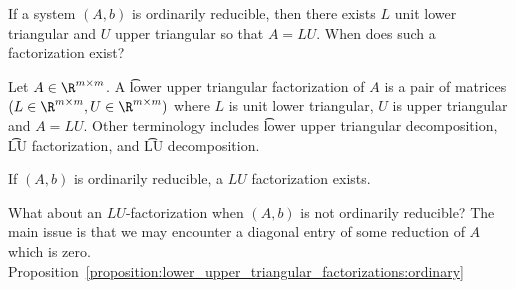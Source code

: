 

If a system $(A, b)$ is ordinarily reducible, then there exists $L$ unit lower triangular and $U$ upper triangular so that $A = LU$.
When does such a factorization exist?


Let $A \in \R^{m \times m}$.
A \t{lower upper triangular factorization} of $A$ is a pair of matrices $(L \in \R^{m \times m}, U \in \R^{m \times m})$ where $L$ is unit lower triangular, $U$ is upper triangular and $A = LU$.
Other terminology includes \t{lower upper triangular decomposition}, \t{LU factorization}, and \t{LU decomposition}.

\begin{proposition}
  If $(A, b)$ is ordinarily reducible, a $LU$ factorization exists.
  \label{proposition:lower_upper_triangular_factorizations:ordinary}
\end{proposition}

What about an $LU$-factorization when $(A, b)$ is not ordinarily reducible?
The main issue is that we may encounter a diagonal entry of some reduction of $A$ which is zero.
Proposition~\ref{proposition:lower_upper_triangular_factorizations:ordinary}




%
%
%

